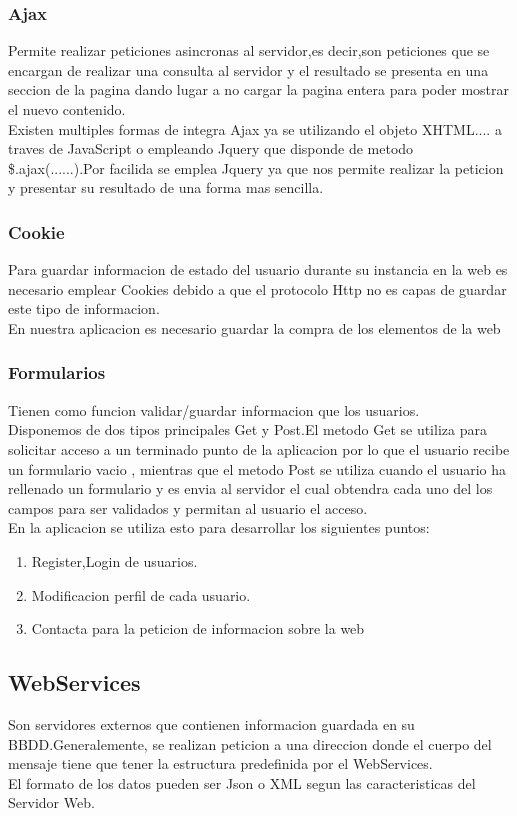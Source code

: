 \subsubsection*{Ajax}
Permite realizar peticiones asincronas al servidor,es decir,son peticiones que se encargan de realizar una consulta al servidor y el resultado se presenta en una seccion de la pagina dando lugar a no cargar la pagina entera para poder mostrar el nuevo contenido.
\\Existen multiples formas de integra Ajax ya se utilizando el objeto XHTML.... a traves de JavaScript o empleando Jquery que disponde de metodo \$.ajax(......).Por facilida se emplea Jquery ya que nos permite realizar la peticion y presentar su resultado de una forma mas sencilla.
\subsubsection*{Cookie}
Para guardar informacion de estado del usuario durante su instancia en la web es necesario emplear Cookies debido a que el protocolo Http  no es capas de guardar este tipo de informacion.
\\En nuestra aplicacion es necesario guardar la compra de los elementos de la web 
\subsubsection*{Formularios}
Tienen como funcion validar/guardar informacion que los usuarios.
\\Disponemos de dos tipos principales Get y Post.El metodo Get se utiliza para solicitar acceso a un terminado punto de la aplicacion por lo que el usuario recibe un formulario vacio , mientras que el metodo Post se utiliza cuando el usuario ha rellenado un formulario y es envia al servidor el cual obtendra cada uno  del los campos para ser validados y permitan al usuario el acceso.
\\En la aplicacion se utiliza esto para desarrollar los siguientes puntos:
\begin{enumerate}
\item Register,Login de usuarios.
\item Modificacion perfil de cada usuario.
\item Contacta para la peticion de informacion sobre la web
\end{enumerate}
\subsection{WebServices}
Son servidores externos que contienen informacion guardada en su BBDD.Generalemente, se realizan peticion a una direccion donde el cuerpo del mensaje tiene que tener la estructura predefinida por el WebServices.
\\El formato de los datos pueden ser Json o XML segun las caracteristicas del Servidor Web. 
